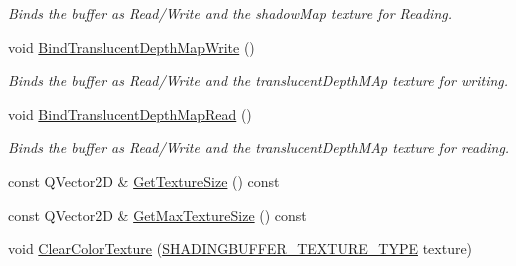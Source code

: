 \begin{DoxyCompactItemize}
\begin{DoxyCompactList}\small\item\em Binds the buffer as Read/\+Write and the shadow\+Map texture for Reading. \end{DoxyCompactList}\item 
\mbox{\label{class_geometry_engine_1_1_geometry_buffer_1_1_shading_buffer_a25f370a575c43a131fcdbe25aab9b3f1}} 
void \mbox{\hyperlink{class_geometry_engine_1_1_geometry_buffer_1_1_shading_buffer_a25f370a575c43a131fcdbe25aab9b3f1}{Bind\+Translucent\+Depth\+Map\+Write}} ()
\begin{DoxyCompactList}\small\item\em Binds the buffer as Read/\+Write and the translucent\+Depth\+M\+Ap texture for writing. \end{DoxyCompactList}\item 
\mbox{\label{class_geometry_engine_1_1_geometry_buffer_1_1_shading_buffer_a9ee3f5301379da20df2a2550c44c9576}} 
void \mbox{\hyperlink{class_geometry_engine_1_1_geometry_buffer_1_1_shading_buffer_a9ee3f5301379da20df2a2550c44c9576}{Bind\+Translucent\+Depth\+Map\+Read}} ()
\begin{DoxyCompactList}\small\item\em Binds the buffer as Read/\+Write and the translucent\+Depth\+M\+Ap texture for reading. \end{DoxyCompactList}\item 
const Q\+Vector2D \& \mbox{\hyperlink{class_geometry_engine_1_1_geometry_buffer_1_1_shading_buffer_aae6f448abdadd4ef47b7b19984fc3831}{Get\+Texture\+Size}} () const
\item 
const Q\+Vector2D \& \mbox{\hyperlink{class_geometry_engine_1_1_geometry_buffer_1_1_shading_buffer_a6b45a6a2cc97775c11b6c6ff72bbc2b6}{Get\+Max\+Texture\+Size}} () const
\item 
void \mbox{\hyperlink{class_geometry_engine_1_1_geometry_buffer_1_1_shading_buffer_aea07ae2845342993bc8949f7e52a4c90}{Clear\+Color\+Texture}} (\mbox{\hyperlink{class_geometry_engine_1_1_geometry_buffer_1_1_shading_buffer_a8047a079ff9fb9fa3400651664c92ae9}{S\+H\+A\+D\+I\+N\+G\+B\+U\+F\+F\+E\+R\+\_\+\+T\+E\+X\+T\+U\+R\+E\+\_\+\+T\+Y\+PE}} texture)
\item 
\mbox{\label{class_geometry_engine_1_1_geometry_buffer_1_1_shading_buffer_af1ad5bf164f69282807959bbeaf2e975}} 

\end{DoxyCompactItemize}
